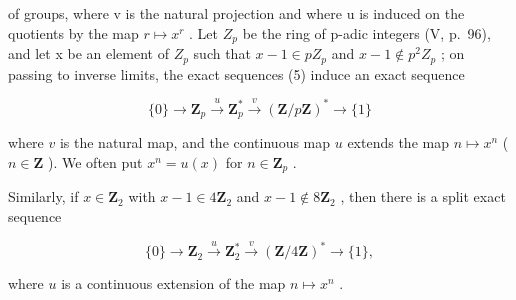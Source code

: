 of groups, where v is the natural projection and where u is induced on the quotients by the map \(r \mapsto x^{r}\) . Let \(Z_{p}\) be the ring of p-adic integers (V, p.~96), and let x be an element of \(Z_{p}\) such that \(x - 1 \in pZ_{p}\) and \(x - 1 \notin p^{2}Z_{p}\) ; on passing to inverse limits, the exact sequences (5) induce an exact sequence

\[
\{0 \} \rightarrow \mathbf {Z} _ {p} \stackrel {u} {\rightarrow} \mathbf {Z} _ {p} ^ {*} \stackrel {v} {\rightarrow} (\mathbf {Z} / p \mathbf {Z}) ^ {*} \rightarrow \{1 \}
\]

where \(v\) is the natural map, and the continuous map \(u\) extends the map \(n \mapsto x^n\) ( \(n \in \mathbf{Z}\) ). We often put \(x^n = u(x)\) for \(n \in \mathbf{Z}_p\) .

Similarly, if \(x \in \mathbf{Z}_2\) with \(x - 1 \in 4\mathbf{Z}_2\) and \(x - 1 \notin 8\mathbf{Z}_2\) , then there is a split exact sequence

\[
\{0 \} \rightarrow \mathbf {Z} _ {2} \stackrel {{u}} {{\rightarrow}} \mathbf {Z} _ {2} ^ {*} \stackrel {{v}} {{\rightarrow}} (\mathbf {Z} / 4 \mathbf {Z}) ^ {*} \rightarrow \{1 \},
\]

where \(u\) is a continuous extension of the map \(n \mapsto x^n\) .

